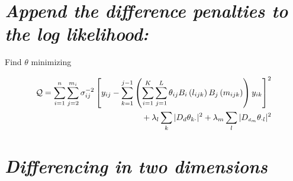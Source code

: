 \documentclass[12pt]{article}
\newcommand{\ms}{\scriptscriptstyle}
\theoremstyle{definition}
\begin{document}
 
\section{\emph{Append the difference penalties to the log likelihood:}}

Find $\theta$ minimizing

\begin{align*}\label{eq:unfolded-row-column-difference-penalty}
\mathcal{Q}=\sum_{i=1}^n \sum_{j=2}^{m_i} \sigma_{ij}^{-2} \left[y_{ij} - \sum_{k=1}^{j-1}\left(\sum_{i=1}^K \sum_{j=1}^L \theta_{ij} B_{i}\left(l_{ijk}\right) B_{j}\left( m_{ijk} \right)  \right) y_{ik} \right]^2 \\
\mbox{\;\;\;\;\;\;\;\;}+ \lambda_l \sum_{k} \vert D_d \theta_{k \cdot} \vert^2 + \lambda_m \sum_{l} \vert D_{\ms d_{\ms m}} \theta_{\cdot l} \vert^2 
\end{align*}

 
%



 
\section{\emph{Differencing in two dimensions}}
\end{document}
